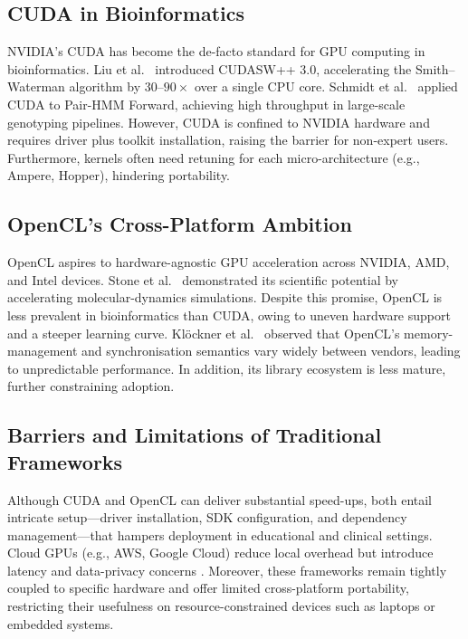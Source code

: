 \documentclass[PhD]{PHlab-thesis}
\begin{document}
\subsection{CUDA in Bioinformatics}
NVIDIA's CUDA has become the de-facto standard for GPU computing in bioinformatics. Liu et al.\ \cite{LiuWirawan2013} introduced CUDASW++ 3.0, accelerating the Smith–Waterman algorithm by $30$–$90\times$ over a single CPU core. Schmidt et al.\ \cite{Schmidt2024-gpuPairHMM} applied CUDA to Pair-HMM Forward, achieving high throughput in large-scale genotyping pipelines. However, CUDA is confined to NVIDIA hardware and requires driver plus toolkit installation, raising the barrier for non-expert users. Furthermore, kernels often need retuning for each micro-architecture (e.g., Ampere, Hopper), hindering portability.

\subsection{OpenCL's Cross-Platform Ambition}
OpenCL aspires to hardware-agnostic GPU acceleration across NVIDIA, AMD, and Intel devices. Stone et al.\ \cite{Stone2010-opencl} demonstrated its scientific potential by accelerating molecular-dynamics simulations. Despite this promise, OpenCL is less prevalent in bioinformatics than CUDA, owing to uneven hardware support and a steeper learning curve. Klöckner et al.\ \cite{Klockner2012} observed that OpenCL's memory-management and synchronisation semantics vary widely between vendors, leading to unpredictable performance. In addition, its library ecosystem is less mature, further constraining adoption.

\subsection{Barriers and Limitations of Traditional Frameworks}
Although CUDA and OpenCL can deliver substantial speed-ups, both entail intricate setup—driver installation, SDK configuration, and dependency management—that hampers deployment in educational and clinical settings. Cloud GPUs (e.g., AWS, Google Cloud) reduce local overhead but introduce latency and data-privacy concerns \cite{Krampis2012}. Moreover, these frameworks remain tightly coupled to specific hardware and offer limited cross-platform portability, restricting their usefulness on resource-constrained devices such as laptops or embedded systems.
\end{document}
